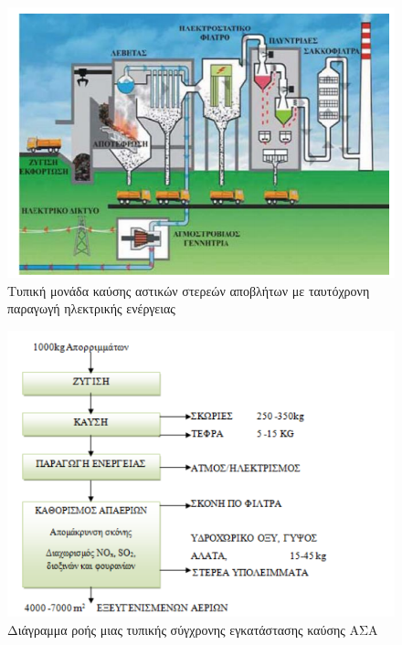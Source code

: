 \documentclass[12pt]{article}
\begin{document}
 	\begin{figure} [H]
 		\begin{center}
 			\includegraphics [scale = 0.60] {system.png}
 			\caption{Τυπική μονάδα καύσης αστικών στερεών αποβλήτων με ταυτόχρονη παραγωγή ηλεκτρικής ενέργειας}
 		\end{center}
 	\end{figure}
 
 	\begin{figure} [H]
 		\begin{center}
 			\includegraphics [scale = 0.60] {system2.png}
 			\caption{Διάγραμμα ροής μιας τυπικής σύγχρονης εγκατάστασης καύσης ΑΣΑ}
 		\end{center}
 	\end{figure}
 
\end{document}
